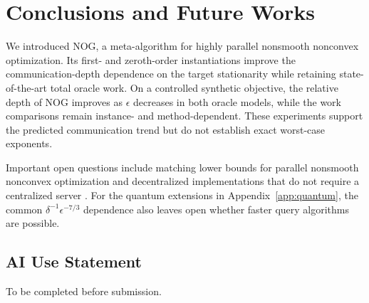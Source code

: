 \documentclass{article}
\def\gO{{\mathcal{O}}}
\theoremstyle{definition}
\theoremstyle{remark}
\begin{document}
\section{Conclusions and Future Works}

	We introduced NOG, a meta-algorithm for highly parallel nonsmooth nonconvex
	optimization.  Its first- and zeroth-order instantiations improve the
	communication-depth dependence on the target stationarity while retaining
	state-of-the-art total oracle work.  On a controlled synthetic objective,
	the relative depth of NOG improves as $\epsilon$ decreases in both oracle
	models, while the work comparisons remain instance- and method-dependent.
	These experiments support the predicted communication trend but do not
	establish exact worst-case exponents.

	Important open questions include matching lower bounds for parallel
	nonsmooth nonconvex optimization and decentralized implementations that do
	not require a centralized server
	\citep{lin2024decentralized,sahinoglu2024online,chen2026decentralized}.
	For the quantum extensions in Appendix~\ref{app:quantum}, the common
	$\delta^{-1}\epsilon^{-7/3}$ dependence also leaves open whether faster
	query algorithms are possible.

\subsection*{AI Use Statement}
To be completed before submission.




\appendix

\end{document}
